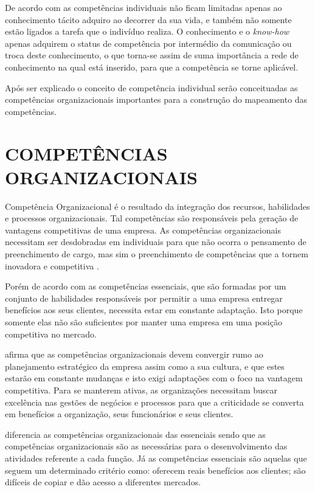 De acordo com  as competências individuais não ficam limitadas apenas ao conhecimento tácito adquiro ao decorrer da sua vida, e também não somente estão ligados a tarefa que o indivíduo realiza. O conhecimento e o \textit{know-how} apenas adquirem o status de competência por intermédio da comunicação ou troca deste conhecimento, o que torna-se assim de suma importância a rede de conhecimento na qual está inserido, para que a competência se torne aplicável.

Após ser explicado o conceito de competência individual serão conceituadas as competências organizacionais importantes para a construção do mapeamento das competências.



\section{COMPETÊNCIAS ORGANIZACIONAIS}

Competência Organizacional é o resultado da integração dos recursos, habilidades e processos organizacionais. Tal competências são responsáveis pela geração de vantagens competitivas de uma empresa. As competências organizacionais necessitam ser desdobradas em individuais para que não ocorra o pensamento de preenchimento de cargo, mas sim o preenchimento de competências que a tornem inovadora e competitiva \cite{freitas2014proposta}.

Porém de acordo com  as competências essenciais, que são formadas por um conjunto de habilidades responsáveis por permitir a uma empresa entregar benefícios aos seus clientes, necessita estar em constante adaptação. Isto porque somente elas não são suficientes por manter uma empresa em uma posição competitiva no mercado.

 afirma que as competências organizacionais devem convergir rumo ao planejamento estratégico da empresa assim como a sua cultura, e que estes estarão em constante mudanças e isto exigi adaptações com o foco na vantagem competitiva. Para se manterem ativas, as organizações necessitam buscar excelência nas gestões de negócios e processos para que a criticidade se converta em benefícios a organização, seus funcionários e seus clientes.

 diferencia as competências organizacionais das essenciais sendo que as competências organizacionais são as necessárias para o desenvolvimento das atividades referente a cada função. Já as competências essenciais são aquelas que seguem um determinado critério como: oferecem reais benefícios aos clientes; são difíceis de copiar e dão acesso a diferentes mercados.

